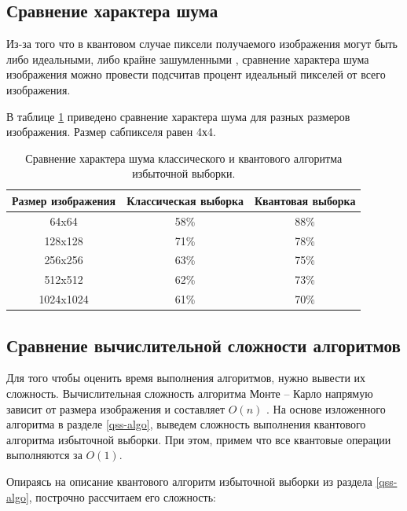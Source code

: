 \subsection{Сравнение характера шума}

Из-за того что в квантовом случае пиксели получаемого изображения могут быть либо идеальными, либо крайне зашумленными \cite{PQC-classic}, сравнение характера шума  изображения можно провести подсчитав процент идеальный пикселей от всего изображения. 

В таблице \ref{tab:noise_02} приведено сравнение характера шума для разных размеров изображения. Размер сабпикселя равен 4х4.

\begin{table}[h!]
	\caption{Сравнение характера шума классического и квантового алгоритма избыточной выборки.}
	\label{tab:noise_02}
	\begin{center}
		\begin{tabular}{|c| c | c|} 
			\hline
			Размер изображения & Классическая выборка & Квантовая выборка \\  
			\hline
			64x64 & 58\% & 88\%  \\
			\hline
			128x128 & 71\% & 78\% \\
			\hline
			256x256 & 63\% & 75\% \\
			\hline
			512x512 & 62\% & 73\% \\
			\hline
			1024x1024 & 61\% & 70\% \\
			\hline
		\end{tabular}
	\end{center}
\end{table}

\subsection{Сравнение вычислительной сложности алгоритмов}

Для того чтобы оценить время выполнения алгоритмов, нужно вывести их сложность. Вычислительная сложность алгоритма Монте -- Карло напрямую зависит от размера изображения и составляет $O(n)$ \cite{mc-complexity}. На основе изложенного алгоритма в разделе \ref{qss-algo}, выведем сложность выполнения квантового алгоритма избыточной выборки. При этом, примем что все квантовые операции выполняются за $O(1)$. 

Опираясь на описание квантового алгоритм избыточной выборки из раздела \ref{qss-algo}, построчно рассчитаем его сложность:

